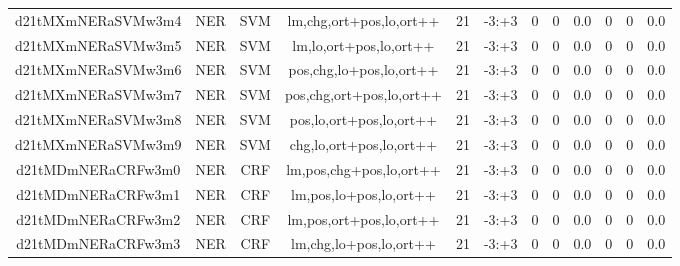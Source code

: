 \documentclass[a4paper]{article}
\begin{document}
\begin{landscape}
\begin{center}
\begin{tabular}{ |c|c|c|c|c|c|c|c|c|c|c|c|}
 
 	
 	\small{ d21tMXmNERaSVMw3m4 } & \small{ NER} & \small{  SVM }  & lm,chg,ort+pos,lo,ort++  &  21 &  \small{  -3:+3 }  &  0 & 0 & 0.0  &  0 & 0 & 0.0 \\
 	

 
 	
 	\small{ d21tMXmNERaSVMw3m5 } & \small{ NER} & \small{  SVM }  & lm,lo,ort+pos,lo,ort++  &  21 &  \small{  -3:+3 }  &  0 & 0 & 0.0  &  0 & 0 & 0.0 \\
 	

 
 	
 	\small{ d21tMXmNERaSVMw3m6 } & \small{ NER} & \small{  SVM }  & pos,chg,lo+pos,lo,ort++  &  21 &  \small{  -3:+3 }  &  0 & 0 & 0.0  &  0 & 0 & 0.0 \\
 	

 
 	
 	\small{ d21tMXmNERaSVMw3m7 } & \small{ NER} & \small{  SVM }  & pos,chg,ort+pos,lo,ort++  &  21 &  \small{  -3:+3 }  &  0 & 0 & 0.0  &  0 & 0 & 0.0 \\
 	

 
 	
 	\small{ d21tMXmNERaSVMw3m8 } & \small{ NER} & \small{  SVM }  & pos,lo,ort+pos,lo,ort++  &  21 &  \small{  -3:+3 }  &  0 & 0 & 0.0  &  0 & 0 & 0.0 \\
 	

 
 	
 	\small{ d21tMXmNERaSVMw3m9 } & \small{ NER} & \small{  SVM }  & chg,lo,ort+pos,lo,ort++  &  21 &  \small{  -3:+3 }  &  0 & 0 & 0.0  &  0 & 0 & 0.0 \\
 	

 
 	
 	\small{ d21tMDmNERaCRFw3m0 } & \small{ NER} & \small{  CRF }  & lm,pos,chg+pos,lo,ort++  &  21 &  \small{  -3:+3 }  &  0 & 0 & 0.0  &  0 & 0 & 0.0 \\
 	

 
 	
 	\small{ d21tMDmNERaCRFw3m1 } & \small{ NER} & \small{  CRF }  & lm,pos,lo+pos,lo,ort++  &  21 &  \small{  -3:+3 }  &  0 & 0 & 0.0  &  0 & 0 & 0.0 \\
 	

 
 	
 	\small{ d21tMDmNERaCRFw3m2 } & \small{ NER} & \small{  CRF }  & lm,pos,ort+pos,lo,ort++  &  21 &  \small{  -3:+3 }  &  0 & 0 & 0.0  &  0 & 0 & 0.0 \\
 	

 
 	
 	\small{ d21tMDmNERaCRFw3m3 } & \small{ NER} & \small{  CRF }  & lm,chg,lo+pos,lo,ort++  &  21 &  \small{  -3:+3 }  &  0 & 0 & 0.0  &  0 & 0 & 0.0 \\
 	


\end{tabular}
\end{center}
\end{landscape}
\end{document}
